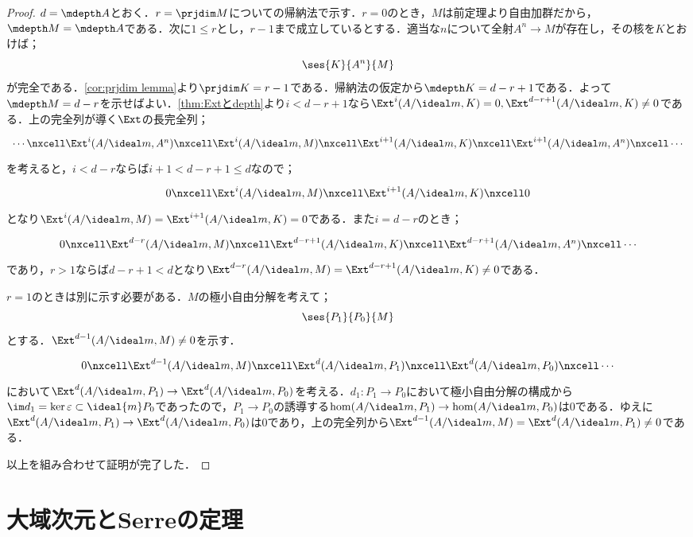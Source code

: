 \begin{proof}
	$d=\mdepth A$とおく．$r=\prjdim M$についての帰納法で示す．$r=0$のとき，$M$は前定理より自由加群だから，$\mdepth M=\mdepth A$である．次に$1\leq r$とし，$r-1$まで成立しているとする．適当な$n$について全射$A^n\to M$が存在し，その核を$K$とおけば；
	\[\ses{K}{A^n}{M}\]
	が完全である．\ref{cor:prjdim lemma}より$\prjdim K=r-1$である．帰納法の仮定から$\mdepth K=d-r+1$である．よって$\mdepth M=d-r$を示せばよい．\ref{thm:Extとdepth}より$i<d-r+1$なら$\Ext^i(A/\ideal m,K)=0,\Ext^{d-r+1}(A/\ideal m,K)\neq0$である．上の完全列が導く$\Ext$の長完全列；
	\[\begin{tikzcd}
	\cdots\nxcell\Ext^i(A/\ideal m,A^n)\nxcell\Ext^i(A/\ideal m,M)\nxcell\Ext^{i+1}(A/\ideal m,K)\nxcell\Ext^{i+1}(A/\ideal m,A^n)\nxcell\cdots
	\end{tikzcd}\]
	を考えると，$i<d-r$ならば$i+1<d-r+1\leq d$なので；
	\[\begin{tikzcd}
	0\nxcell\Ext^i(A/\ideal m,M)\nxcell\Ext^{i+1}(A/\ideal m,K)\nxcell0
	\end{tikzcd}\]
	となり$\Ext^i(A/\ideal m,M)=\Ext^{i+1}(A/\ideal m,K)=0$である．また$i=d-r$のとき；
	\[\begin{tikzcd}
	0\nxcell\Ext^{d-r}(A/\ideal m,M)\nxcell\Ext^{d-r+1}(A/\ideal m,K)\nxcell\Ext^{d-r+1}(A/\ideal m,A^n)\nxcell\cdots
	\end{tikzcd}\]
	であり，$r>1$ならば$d-r+1<d$となり$\Ext^{d-r}(A/\ideal m,M)=\Ext^{d-r+1}(A/\ideal m,K)\neq0$である．
	
	$r=1$のときは別に示す必要がある．$M$の極小自由分解を考えて；
	\[\ses{P_1}{P_0}{M}\]
	とする．$\Ext^{d-1}(A/\ideal m,M)\neq0$を示す．
	\[\begin{tikzcd}
	0\nxcell\Ext^{d-1}(A/\ideal m,M)\nxcell\Ext^d(A/\ideal m,P_1)\nxcell\Ext^d(A/\ideal m,P_0)\nxcell\cdots
	\end{tikzcd}\]
	において$\Ext^d(A/\ideal m,P_1)\to\Ext^d(A/\ideal m,P_0)$を考える．$d_1:P_1\to P_0$において極小自由分解の構成から$\im d_1=\ker \varepsilon\subset\ideal{m}P_0$であったので，$P_1\to P_0$の誘導する$\hom(A/\ideal m,P_1)\to\hom(A/\ideal m,P_0)$は$0$である．ゆえに$\Ext^d(A/\ideal m,P_1)\to\Ext^d(A/\ideal m,P_0)$は$0$であり，上の完全列から$\Ext^{d-1}(A/\ideal m,M)=\Ext^d(A/\ideal m,P_1)\neq0$である．
	
	以上を組み合わせて証明が完了した．
\end{proof}

\section{大域次元とSerreの定理}

